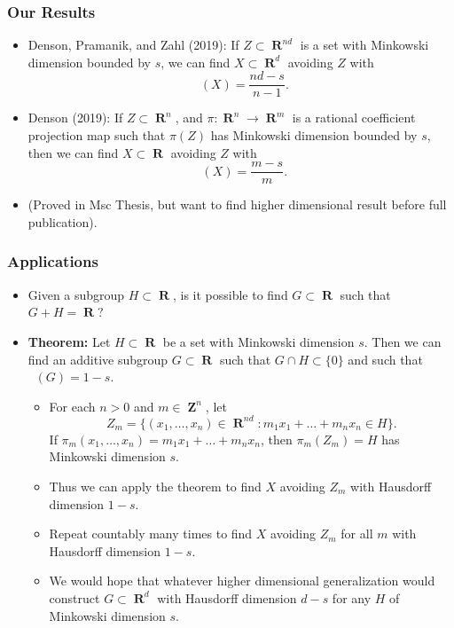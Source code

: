 \documentclass[usenames,dvipsnames]{beamer}
\DeclareMathOperator{\RR}{\textbf{R}}
\DeclareMathOperator{\ZZ}{\textbf{Z}}
\DeclareMathOperator{\hausdim}{\text{dim}_{\textbf{H}}}
\begin{document}
\begin{frame}
    \frametitle{Our Results}

    \begin{itemize}
        \item Denson, Pramanik, and Zahl (2019): If $Z \subset \RR^{nd}$ is a set with Minkowski dimension bounded by $s$, we can find $X \subset \RR^d$ avoiding $Z$ with
        \[ \hausdim(X) = \frac{nd-s}{n-1}. \]

        \pause
        \item Denson (2019): If $Z \subset \RR^n$, and $\pi: \RR^n \to \RR^m$ is a rational coefficient projection map such that $\pi(Z)$ has Minkowski dimension bounded by $s$, then we can find $X \subset \RR$ avoiding $Z$ with
        \[ \hausdim(X) = \frac{m - s}{m}. \]

        \pause
        \item 
        (Proved in Msc Thesis, but want to find higher dimensional result before full publication).
    \end{itemize}
\end{frame}





\begin{frame}
    \frametitle{Applications}

    \begin{itemize}
        \item Given a subgroup $H \subset \RR$, is it possible to find $G \subset \RR$ such that $G + H = \RR$?

        \pause
        \item \textbf{Theorem:} Let $H \subset \RR$ be a set with Minkowski dimension $s$. Then we can find an additive subgroup $G \subset \RR$ such that $G \cap H \subset \{ 0 \}$ and such that $\hausdim(G) = 1-s$.
        \begin{itemize}
            \pause
            \item For each $n > 0$ and $m \in \ZZ^n$, let
            \[ Z_m = \{ (x_1, \dots, x_n) \in \RR^{nd} : m_1x_1 + \dots + m_nx_n \in H \}. \]
            If $\pi_m(x_1, \dots, x_n) = m_1 x_1 + \dots + m_n x_n$, then $\pi_m(Z_m) = H$ has Minkowski dimension $s$.

            \pause
            \item Thus we can apply the theorem to find $X$ avoiding $Z_m$ with Hausdorff dimension $1 - s$.

            \pause
            \item Repeat countably many times to find $X$ avoiding $Z_m$ for all $m$ with Hausdorff dimension $1-s$.

            \pause
            \item We would hope that whatever higher dimensional generalization would construct $G \subset \RR^d$ with Hausdorff dimension $d - s$ for any $H$ of Minkowski dimension $s$.
        \end{itemize}
    \end{itemize}
\end{frame}
\end{document}
